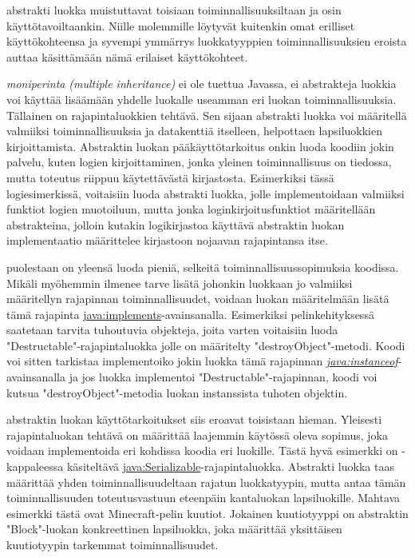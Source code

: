 \documentclass{tufte-book}
\newcommand{\eng}[1]{\textit{(#1)}}
\newcommand{\new}[1]{\textit{\gls{#1}}}
\newcommand{\neweng}[2]{\new{#1} \eng{#2}}
\newcommand{\java}[1]{\underline{\gls{java:#1}}}
\newcommand{\newjava}[1]{\textit{\java{#1}}}
\begin{document}
 abstrakti luokka muistuttavat toisiaan toiminnallisuuksiltaan ja
osin käyttötavoiltaankin. Niille molemmille löytyvät kuitenkin omat erilliset käyttökohteensa ja
syvempi ymmärrys luokkatyyppien toiminnallisuuksien eroista auttaa käsittämään nämä erilaiset
käyttökohteet.

 \neweng{moniperinta}{multiple inheritance} ei ole tuettua Javassa, ei
abstrakteja luokkia voi käyttää lisäämään yhdelle luokalle useamman eri luokan toiminnallisuuksia.
Tällainen on rajapintaluokkien tehtävä. Sen sijaan abstrakti luokka voi määritellä valmiiksi
toiminnallisuuksia ja datakenttiä itselleen, helpottaen lapsiluokkien kirjoittamista. Abstraktin
luokan pääkäyttötarkoitus onkin luoda koodiin jokin palvelu, kuten logien kirjoittaminen, jonka
yleinen toiminnallisuus on tiedossa, mutta toteutus riippuu käytettävästä kirjastosta. Esimerkiksi
tässä logiesimerkissä, voitaisiin luoda abstrakti luokka, jolle implementoidaan valmiiksi funktiot
logien muotoiluun, mutta jonka loginkirjoitusfunktiot määritellään abstrakteina, jolloin kutakin
logikirjastoa käyttävä abstraktin luokan implementaatio määrittelee kirjastoon nojaavan
rajapintansa itse.

 puolestaan on yleensä luoda pieniä, selkeitä
toiminnallisuussopimuksia koodissa. Mikäli myöhemmin ilmenee tarve lisätä johonkin luokkaan jo
valmiiksi määritellyn rajapinnan toiminnallisuudet, voidaan luokan määritelmään lisätä tämä
rajapinta \java{implements}-avainsanalla. Esimerkiksi pelinkehityksessä saatetaan tarvita
tuhoutuvia objekteja, joita varten voitaisiin luoda "Destructable"-rajapintaluokka jolle on
määritelty "destroyObject"-metodi. Koodi voi sitten tarkistaa implementoiko jokin luokka tämä
rajapinnan \newjava{instanceof}-avainsanalla ja jos luokka implementoi "Destructable"-rajapinnan,
koodi voi kutsua "destroyObject"-metodia luokan instanssista tuhoten objektin.

 abstraktin luokan käyttötarkoitukset siis eroavat toisistaan
hieman. Yleisesti rajapintaluokan tehtävä on määrittää laajemmin käytössä oleva sopimus, joka
voidaan implementoida eri kohdissa koodia eri luokille. Tästä hyvä esimerkki on
-kappaleessa käsiteltävä \java{Serializable}-rajapintaluokka. Abstrakti
luokka taas määrittää yhden toiminnallisuudeltaan rajatun luokkatyypin, mutta antaa tämän
toiminnallisuuden toteutusvastuun eteenpäin kantaluokan lapsiluokille. Mahtava esimerkki tästä
ovat Minecraft-pelin kuutiot. Jokainen kuutiotyyppi on abstraktin "Block"-luokan konkreettinen
lapsiluokka, joka määrittää yksittäisen kuutiotyypin tarkemmat toiminnallisuudet.
\end{document}
